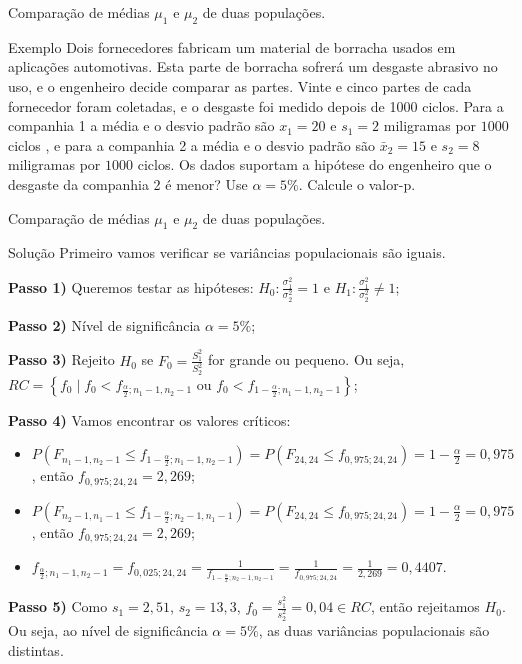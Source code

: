 \documentclass[9pt]{beamer}
\begin{document}
\begin{frame}{Comparação de médias $\mu_1$ e $\mu_2$ de duas populações.}

\begin{block}{Exemplo}
	Dois fornecedores fabricam um material de borracha usados em aplicações automotivas. Esta parte de borracha sofrerá um desgaste abrasivo no uso, e o engenheiro decide comparar as partes. Vinte e cinco partes de cada fornecedor foram coletadas, e o desgaste foi medido depois de 1000 ciclos. Para a companhia 1 a média e o desvio padrão são $x_1 = 20$ e $s_1 = 2$ miligramas  por $1000$ ciclos , e para a companhia 2 a média e o desvio padrão são $\bar{x}_2=15$ e $s_2=8$ miligramas por $1000$ ciclos. Os dados suportam a hipótese do engenheiro que o desgaste da companhia 2 é menor? Use $\alpha=5\%$. Calcule o valor-p.
\end{block}
 
\end{frame}

\begin{frame}{Comparação de médias $\mu_1$ e $\mu_2$ de duas populações.}

\begin{block}{Solução}
	Primeiro vamos verificar se variâncias populacionais são iguais.
	
	\textbf{Passo 1)} Queremos testar as hipóteses: $H_0: \frac{\sigma_1^2}{\sigma_2^2} = 1$ e $H_1:\frac{\sigma_1^2}{\sigma_2^2} \neq 1$;
	
	\textbf{Passo 2)} Nível de significância $\alpha=5\%$;
	
	\textbf{Passo 3)} Rejeito $H_0$ se $F_0 = \frac{S_1^2}{S_2^2}$ for grande ou pequeno. Ou seja, $RC= \left\{ f_0 \mid f_0 < f_{\frac{\alpha}{2}; n_1-1, n_2-1} \mbox{ ou } f_0 < f_{1-\frac{\alpha}{2};n_1-1, n_2-1} \right\}$;
	
	\textbf{Passo 4)} Vamos encontrar os valores críticos:
	\begin{itemize}
		\item $P(F_{n_1-1, n_2-1} \leq f_{1-\frac{\alpha}{2}; n_1-1, n_2-1}) = P(F_{24, 24} \leq f_{0,975; 24, 24}) = 1-\frac{\alpha}{2} = 0,975$, então $f_{0,975; 24, 24} = 2,269$;
		\item $P(F_{n_2-1, n_1-1} \leq f_{1-\frac{\alpha}{2}; n_2-1, n_1-1}) = P(F_{24, 24} \leq f_{0,975; 24, 24}) = 1-\frac{\alpha}{2} = 0,975$, então $f_{0,975; 24, 24} = 2,269$;
		\item $f_{\frac{\alpha}{2};n_1-1, n_2-1} = f_{0,025; 24, 24} = \frac{1}{f_{1-\frac{\alpha}{2}; n_2-1, n_2-1}} = \frac{1}{f_{0,975; 24, 24}} = \frac{1}{2,269} =0,4407$.
	\end{itemize}
	
	\textbf{Passo 5)} Como $s_1=2,51$, $s_2 = 13,3$, $f_0 = \frac{s_1^2}{s_2^2} = 0,04 \in RC$, então rejeitamos $H_0$. Ou seja, ao nível de significância $\alpha=5\%$, as duas variâncias populacionais são distintas.
\end{block}
\end{frame}
\end{document}
